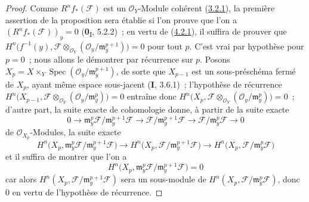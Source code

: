 \begin{proof}
Comme $R^nf_*(\mathcal F)$ est un $\mathcal O_Y$-Module cohérent
(\hyperref[III.3.2.1-fr]{3.2.1}), la première assertion de la proposition
sera établie si l'on prouve que l'on a
$(R^nf_*(\mathcal F))_y=0$ (\textbf{0}\textsubscript{I}, 5.2.2)~; en vertu de
(\hyperref[III.4.2.1-fr]{4.2.1}), il suffira de prouver que
$H^n\bigl(f^{-1}(y),\mathcal F\otimes_{\mathcal O_Y}
(\mathcal O_y/\mathfrak m_y^{p+1})\bigr)=0$
pour tout $p$. C'est vrai par hypothèse pour $p=0$~; nous allons le démontrer
par récurrence sur $p$. Posons
$X_p=X\times_Y\operatorname{Spec}
(\mathcal O_y/\mathfrak m_y^{p+1})$,
de sorte que $X_{p-1}$ est un sous-préschéma fermé de $X_p$, ayant même
espace sous-jacent (\textbf{I}, 3.6.1)~; l'hypothèse de récurrence
$H^n\bigl(X_{p-1},\mathcal F\otimes_{\mathcal O_Y}
(\mathcal O_y/\mathfrak m_y^p)\bigr)=0$
entraîne donc
$H^n\bigl(X_p,\mathcal F\otimes_{\mathcal O_Y}
(\mathcal O_y/\mathfrak m_y^p)\bigr)=0$~;
d'autre part, la suite exacte de cohomologie donne, à partir de la suite
exacte
\[
0\longrightarrow
\mathfrak m_y^p\mathcal F/\mathfrak m_y^{p+1}\mathcal F
\longrightarrow
\mathcal F/\mathfrak m_y^{p+1}\mathcal F
\longrightarrow
\mathcal F/\mathfrak m_y^p\mathcal F
\longrightarrow0
\]
de $\mathcal O_{X_p}$-Modules, la suite exacte
\[
H^n\bigl(X_p,
\mathfrak m_y^p\mathcal F/\mathfrak m_y^{p+1}\mathcal F\bigr)
\longrightarrow
H^n\bigl(X_p,\mathcal F/\mathfrak m_y^{p+1}\mathcal F\bigr)
\longrightarrow
H^n\bigl(X_p,\mathcal F/\mathfrak m_y^p\mathcal F\bigr)
\]
et il suffira de montrer que l'on a
\[
\label{III.4.6.1.1-fr}
H^n\bigl(X_p,
\mathfrak m_y^p\mathcal F/\mathfrak m_y^{p+1}\mathcal F\bigr)=0
\tag{4.6.1.1}
\]
car alors $H^n(X_p,\mathcal F/\mathfrak m_y^{p+1}\mathcal F)$ sera un
sous-module de $H^n(X_p,\mathcal F/\mathfrak m_y^p\mathcal F)$, donc $0$ en
vertu de l'hypothèse de récurrence.


\end{proof}
